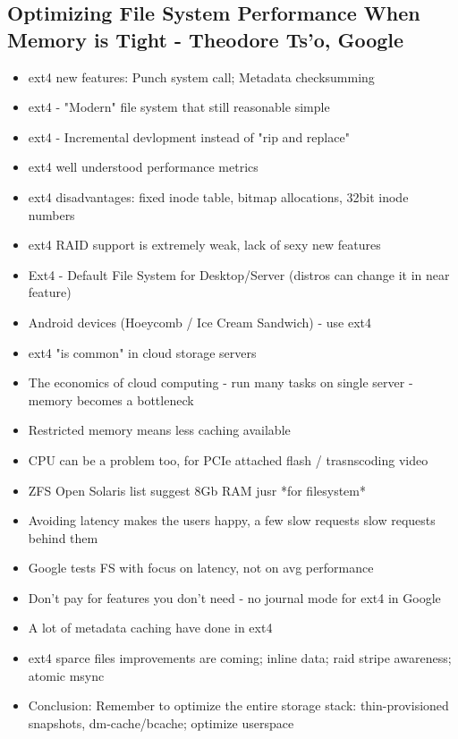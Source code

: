 \documentclass[10pt]{article}
\begin{document}
{\subsection{Optimizing File System Performance When Memory is Tight - Theodore Ts'o, Google}
\begin{itemize}
\item ext4 new features: Punch system call; Metadata checksumming
\item ext4 - "Modern" file system that still reasonable simple
\item ext4 - Incremental devlopment instead of "rip and replace"
\item ext4 well understood performance metrics
\item ext4 disadvantages: fixed inode table, bitmap allocations, 32bit inode numbers
\item ext4 RAID support is extremely weak, lack of sexy new features
\item Ext4 - Default File System for Desktop/Server (distros can change it in near feature)
\item Android devices (Hoeycomb / Ice Cream Sandwich) - use ext4
\item ext4 "is common" in cloud storage servers
\item The economics of cloud computing - run many tasks on single server - memory becomes a bottleneck
\item Restricted memory means less caching available
\item CPU can be a problem too, for PCIe attached flash / trasnscoding video
\item ZFS Open Solaris list suggest 8Gb RAM jusr *for filesystem*
\item Avoiding latency makes the users happy, a few slow requests slow requests behind them
\item Google tests FS with focus on latency, not on avg performance
\item Don't pay for features you don't need - no journal mode for ext4 in Google
\item A lot of metadata caching have done in ext4
\item ext4 sparce files improvements are coming; inline data; raid stripe awareness; atomic msync
\item Conclusion: Remember to optimize the entire storage stack: thin-provisioned snapshots, dm-cache/bcache; optimize userspace
\end{itemize}

}
\end{document}
